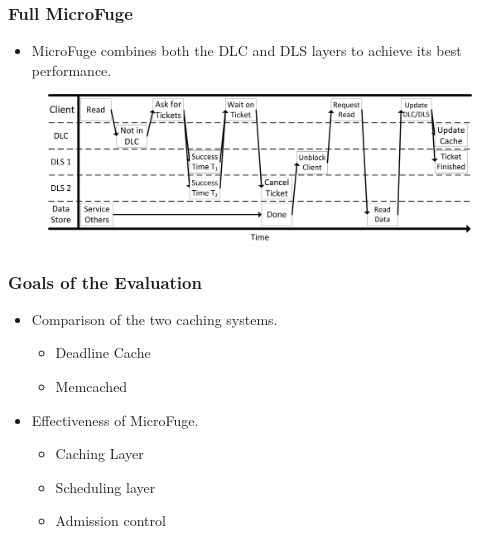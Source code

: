 \documentclass{beamer}
\begin{document}
\begin{frame}
  \frametitle{Full MicroFuge}
  \begin{itemize}
  \item
    MicroFuge combines both the DLC and DLS layers to achieve its best
    performance.
  \end{itemize}

  \begin{figure}
    \begin{center}
      \centerline{\includegraphics[scale=0.60]{img/RequestTimelineHorizontal.png}}
    \end{center}
  \end{figure}
\end {frame}



\begin{frame}
  \frametitle{Goals of the Evaluation}
  \begin{itemize}
  \item Comparison of the two caching systems.
    \begin{itemize}
    \item Deadline Cache
    \item Memcached
    \end{itemize}
  \item Effectiveness of MicroFuge.
    \begin{itemize}
    \item Caching Layer
    \item Scheduling layer
    \item Admission control
    \end{itemize}
  \end{itemize}
\end{frame}
\end{document}
